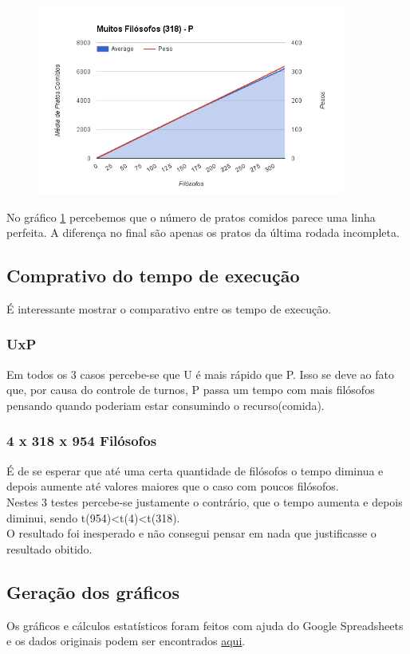 \documentclass[paper=a4, fontsize=11pt]{scrartcl}
\numberwithin{equation}{section}		%
\numberwithin{figure}{section}			%
\numberwithin{table}{section}				%
\begin{document}
\begin{figure}[H]
	\centering
	\includegraphics[width=0.9\textwidth]{image10}
	\caption{}
	\label{image10}
\end{figure}

No gráfico \ref{image10} percebemos que o número de pratos comidos parece uma linha perfeita. A diferença no final são apenas os pratos da última rodada incompleta.

\pagebreak
\subsection{Comprativo do tempo de execução}
É interessante mostrar o comparativo entre os tempo de execução.

\subsubsection{UxP}
Em todos os 3 casos percebe-se que U é mais rápido que P. Isso se deve ao fato que, por causa do controle de turnos, P passa um tempo com mais filósofos pensando quando poderiam estar consumindo o recurso(comida).

\subsubsection{4 x 318 x 954 Filósofos}
É de se esperar que até uma certa quantidade de filósofos o tempo diminua e depois aumente até valores maiores que o caso com poucos filósofos.\\
Nestes 3 testes percebe-se justamente o contrário, que o tempo aumenta e depois diminui, sendo t(954)<t(4)<t(318).\\
O resultado foi inesperado e não consegui pensar em nada que justificasse o resultado obitido.

\subsection{Geração dos gráficos}
Os gráficos e cálculos estatísticos foram feitos com ajuda do Google Spreadsheets e os dados originais podem ser encontrados \href{https://docs.google.com/spreadsheets/d/1JswsKe4sCJIXDUoLzpxeijnz9dtqEFNVYMwKC01sZhg/edit?usp=sharing}{aqui}.\\
\end{document}
